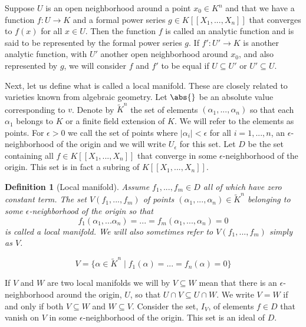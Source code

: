\documentclass{article}
\newtheorem{definition}{Definition}[section]
\begin{document}
Suppose $U$ is an open neighborhood around a point $x_0 \in K^n$ and that we have a function $f : U \to K$ and a formal power series $g \in K[[X_1, ..., X_n]]$ that converges to $f(x)$ for all $x \in U$. Then the function $f$ is called an analytic function and is said to be represented by the formal power series $g$. If $f' : U' \to K$ is another analytic function, with $U'$ another open neighborhood around $x_0$, and also represented by $g$, we will consider $f$ and $f'$ to be equal if $U \subseteq U'$ or $U' \subseteq U$.


Next, let us define what is called a local manifold. These are closely related to varieties known from algebraic geometry. Let $\abs{}$ be an absolute value corresponding to $v$. Denote by $\tilde K^n$ the set of elements $(\alpha_1, ..., \alpha_n)$ so that each $\alpha_1$ belongs to $K$ or a finite field extension of $K$. We will refer to the elements as points. For $\epsilon > 0$ we call the set of points where $|\alpha_i| < \epsilon$ for all $i = 1, ..., n$, an $\epsilon$-neighborhood of the origin and we will write $U_\epsilon$ for this set. 
Let $D$ be the set containing all $f \in K[[X_1, ..., X_n]]$ that converge in some $\epsilon$-neighborhood of the origin. This set is in fact a subring of $K[[X_1, ..., X_n]]$.

\begin{definition}[Local manifold]
    Assume $f_1, ..., f_m \in D$ all of which have zero constant term. The set $V(f_1, ..., f_m)$ of points $(\alpha_1, ..., \alpha_n) \in \tilde {K}^n$ belonging to some $\epsilon$-neighborhood of the origin so that $$f_1(\alpha_1, ... \alpha_n) = ... = f_m(\alpha_1, ..., \alpha_n) = 0$$
    is called a local manifold. We will also sometimes refer to $V(f_1, ..., f_m)$ simply as $V$.
    
    
    $$V = \{\alpha \in \tilde {K}^n \mid f_1 (\alpha) = ... = f_n(\alpha) = 0   \}$$
\end{definition}
If $V$ and $W$ are two local manifolds we will by $V \subseteq W$ mean that there is an $\epsilon$-neighborhood around the origin, $U$, so that $U \cap V \subseteq U \cap W$. We write $V = W$ if and only if both $V \subseteq W$ and $W \subseteq V$.  
Consider the set, $I_V$, of elements $f \in D$ that vanish on $V$ in some $\epsilon$-neighborhood of the origin. This set is an ideal of $D$.
\end{document}
